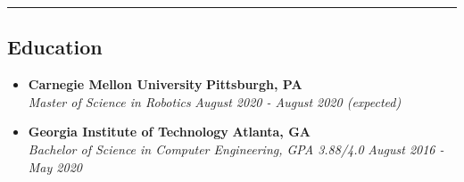 \hrule
\vspace{-1em}
\subsection*{Education}
\ifx\rxucv\undefined
\vspace{-1em}
\fi

\begin{itemize}[label={},leftmargin=1em]
	\parskip=0.1em

	\item 
	\headerrow
		{\textbf{Carnegie Mellon University}}
		{\textbf{Pittsburgh, PA}}
	\\
	\headerrow
		{\emph{Master of Science in Robotics}}
		{\emph{August 2020 - August 2020 (expected)}}
	\vspace{-1.3em}

	\ifx\rxucv\undefined
	\vspace{-1em}
	\fi

	\item
	\headerrow
		{\textbf{Georgia Institute of Technology}}
		{\textbf{Atlanta, GA}}
	\\
	\headerrow
		{\emph{Bachelor of Science in Computer Engineering, GPA 3.88/4.0}}
		{\emph{August 2016 - May 2020}}
	\vspace{-1.3em}

\end{itemize}
